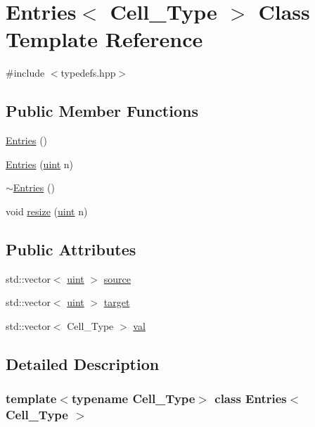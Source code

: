 \hypertarget{class_entries}{}\section{Entries$<$ Cell\+\_\+\+Type $>$ Class Template Reference}
\label{class_entries}


{\ttfamily \#include $<$typedefs.\+hpp$>$}

\subsection*{Public Member Functions}
\begin{DoxyCompactItemize}
\item 
\hyperlink{class_entries_a9e6cba5965f285beb3c0356c79f592d2}{Entries} ()
\item 
\hyperlink{class_entries_a03249234a765e3363ae89dba76b3ff9f}{Entries} (\hyperlink{typedefs_8hpp_a91ad9478d81a7aaf2593e8d9c3d06a14}{uint} n)
\item 
\hyperlink{class_entries_aeda42186376731bd3a9b3902a09395a4}{$\sim$\+Entries} ()
\item 
void \hyperlink{class_entries_a8b539e4c53aab5d6ce8305af346b7089}{resize} (\hyperlink{typedefs_8hpp_a91ad9478d81a7aaf2593e8d9c3d06a14}{uint} n)
\end{DoxyCompactItemize}
\subsection*{Public Attributes}
\begin{DoxyCompactItemize}
\item 
std\+::vector$<$ \hyperlink{typedefs_8hpp_a91ad9478d81a7aaf2593e8d9c3d06a14}{uint} $>$ \hyperlink{class_entries_a6a7c589df4cd6ea98386466440dfdc98}{source}
\item 
std\+::vector$<$ \hyperlink{typedefs_8hpp_a91ad9478d81a7aaf2593e8d9c3d06a14}{uint} $>$ \hyperlink{class_entries_a02dad3917fa68044b9ea9c60b2909fd7}{target}
\item 
std\+::vector$<$ Cell\+\_\+\+Type $>$ \hyperlink{class_entries_ae0726e20b17868665cdae6ff70f93bb4}{val}
\end{DoxyCompactItemize}


\subsection{Detailed Description}
\subsubsection*{template$<$typename Cell\+\_\+\+Type$>$\newline
class Entries$<$ Cell\+\_\+\+Type $>$}



